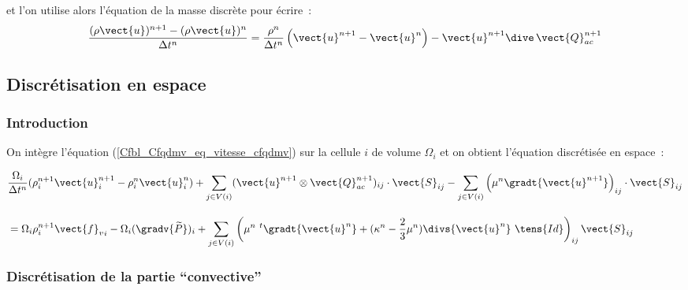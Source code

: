 et l'on utilise alors l'équation de la masse discrète pour écrire~:
\begin{equation}
\displaystyle
\frac{(\rho \vect{u})^{n+1} - (\rho \vect{u})^n}{\Delta t^n}
=
\frac{\rho^{n}}{\Delta t^n}\left(\vect{u}^{n+1} - \vect{u}^n\right)-
\vect{u}^{n+1}\dive\,\vect{Q}_{ac}^{n+1}
\end{equation}



\subsection*{Discrétisation en espace}

\subsubsection*{Introduction}

On intègre l'équation (\ref{Cfbl_Cfqdmv_eq_vitesse_cfqdmv})
sur la cellule $i$ de volume $\Omega_i$ et
on obtient l'équation discrétisée en espace~:

\begin{equation}\label{Cfbl_Cfqdmv_eq_vitesse_discrete_cfqdmv}
\begin{aligned}
&\displaystyle\frac{\Omega_i}{\Delta t^n}
(\rho_i^{n+1}\vect{u}_i^{n+1}-\rho_i^n\vect{u}_i^n)
+ \displaystyle\sum\limits_{j\in V(i)}
(\vect{u}^{n+1} \otimes \vect{Q}_{ac}^{n+1})_{ij} \cdot \vect{S}_{ij}
- \displaystyle\sum\limits_{j\in V(i)}
\left(\mu^n\gradt{\vect{u}^{n+1}}\right)_{ij} \cdot \vect{S}_{ij}\\[1em]
&= \Omega_i\rho_i^{n+1} {\vect{f}_v}_i
- \Omega_i(\gradv{\widetilde{P}})_i
+ \displaystyle\sum\limits_{j\in V(i)}
\left(\mu^n\ ^t\gradt{\vect{u}^n} + (\kappa^n-\frac{2}{3}\mu^n)
\divs{\vect{u}^n}\ \tens{Id}\right)_{ij}\vect{S}_{ij}
\end{aligned}
\end{equation}

\subsubsection*{Discrétisation de la partie ``convective''}

